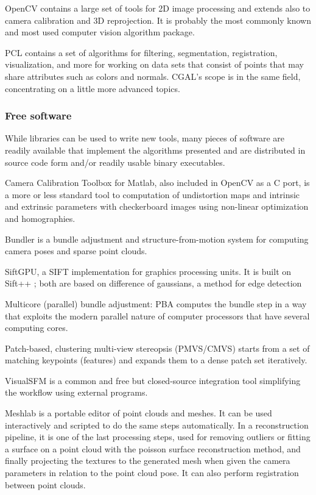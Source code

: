 OpenCV contains a large set of tools for 2D image processing and extends also to camera calibration and 3D reprojection.
It is probably the most commonly known and most used computer vision algorithm package.

PCL contains a set of algorithms for filtering, segmentation, registration, visualization, and more for working on data sets that consist of points that may share attributes such as colors and normals. CGAL's scope is in the same field, concentrating on a little more advanced topics.


\subsubsection{Free software} %

While libraries can be used to write new tools, many pieces of software are readily available that implement the algorithms presented and are distributed in source code form and/or readily usable binary executables.

Camera Calibration Toolbox for Matlab, also included in OpenCV as a C port, is a more or less standard tool to computation of undistortion maps and intrinsic and extrinsic parameters with checkerboard images using non-linear optimization and homographies. \cite{camcalmatlab}

Bundler is a bundle adjustment and structure-from-motion system for computing camera poses and sparse point clouds. \cite{snavely2006photo}

SiftGPU, a SIFT implementation for graphics processing units. \cite{changchang2007siftgpu} It is built on Sift++ \cite{vedaldi2011sift++}; both are based on difference of gaussians, a method for edge detection \cite{marr1980theory}

Multicore (parallel) bundle adjustment: PBA computes the bundle step in a way that exploits the modern parallel nature of computer processors that have several computing cores. \cite{wu2011multicore}

Patch-based, clustering multi-view stereopsis (PMVS/CMVS) starts from a set of matching keypoints (features) and expands them to a dense patch set iteratively. \cite{furukawa2010accurate,furukawa2012patch}

VisualSFM \cite{wu2013towards} is a common and free but closed-source integration tool simplifying the workflow using external programs.

Meshlab \cite{meshlab} is a portable editor of point clouds and meshes.
It can be used interactively and scripted to do the same steps automatically.
In a reconstruction pipeline, it is one of the last processing steps, used for removing outliers or fitting a surface on a point cloud with the poisson surface reconstruction method, and finally projecting the textures to the generated mesh when given the camera parameters in relation to the point cloud pose.
It can also perform registration between point clouds.

